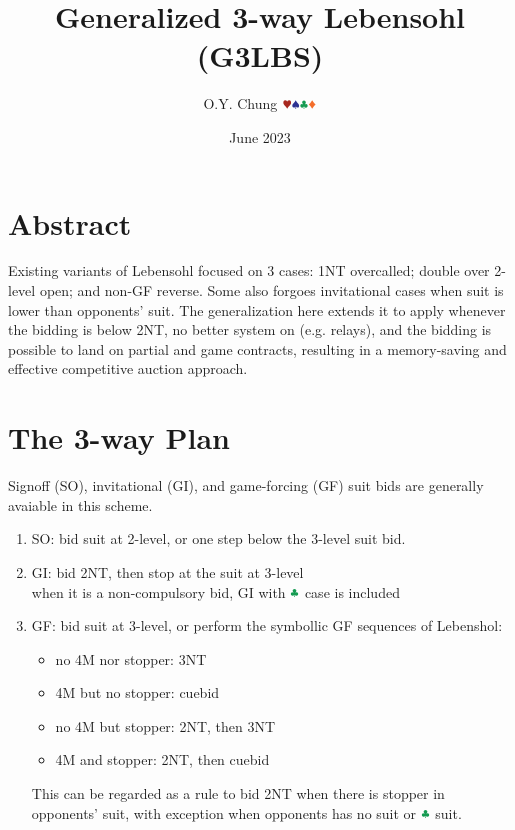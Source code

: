 \documentclass{article}
\title{Generalized 3-way Lebensohl (G3LBS)}
\author{O.Y. Chung $\hhh\sss\ccc\ddd$}
\date{June 2023}
\newcommand*{\ccc}{\textcolor{ForestGreen}{\clubsuit}}
\begin{document}
\begin{CJK*}{UTF8}{gbsn}
\end{CJK*}
\maketitle

\begin{multicols}{2}

\section{Abstract}
Existing variants of Lebensohl focused on 3 cases: 1NT overcalled; double over 2-level open; and non-GF reverse. Some also forgoes invitational cases when suit is lower than opponents' suit. The generalization here extends it to apply whenever the bidding is below 2NT, no better system on (e.g. relays), and the bidding is possible to land on partial and game contracts, resulting in a memory-saving and effective competitive auction approach.

\section{The 3-way Plan}
Signoff (SO), invitational (GI), and game-forcing (GF) suit bids are generally avaiable in this scheme.

\begin{enumerate}
    \setlength\itemsep{-0.2em}
    \item SO: bid suit at 2-level, or one step below the 3-level suit bid.
    \item GI: bid 2NT, then stop at the suit at 3-level \\
    when it is a non-compulsory bid, GI with $\ccc$ case is included
    \item GF: bid suit at 3-level, or perform the symbollic GF sequences of Lebenshol:
    \begin{itemize}
        \setlength\itemsep{-0.2em}
        \item no 4M nor stopper: 3NT
        \item 4M but no stopper: cuebid
        \item no 4M but stopper: 2NT, then 3NT
        \item 4M and stopper: 2NT, then cuebid
    \end{itemize}
    This can be regarded as a rule to bid 2NT when there is stopper in opponents' suit, with exception when opponents has no suit or $\ccc$ suit.
\end{enumerate}


\end{multicols}
\end{document}
